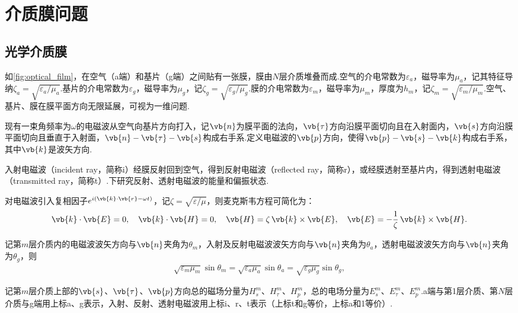 
\chapter{介质膜问题}

\section{光学介质膜}
如\cref{fig:optical_film}，在空气（a端）和基片（g端）之间贴有一张膜，膜由\(N\)层介质堆叠而成.空气的介电常数为\(\varepsilon_a\)，磁导率为\(\mu_a\)，记其特征导纳\(\zeta_a = \sqrt{\varepsilon_a/\mu_a}\).基片的介电常数为\(\varepsilon_g\)，磁导率为\(\mu_g\)，记\(\zeta_g = \sqrt{\varepsilon_g/\mu_g}\).膜的介电常数为\(\varepsilon_m\)，磁导率为\(\mu_m\)，厚度为\(h_m\)，记\(\zeta_m = \sqrt{\varepsilon_m/\mu_m}\).空气、基片、膜在膜平面方向无限延展，可视为一维问题.

现有一束角频率为\(\omega\)的电磁波从空气向基片方向打入，记\(\vb{n}\)为膜平面的法向，\(\vb{\tau}\)方向沿膜平面切向且在入射面内，\(\vb{s}\)方向沿膜平面切向且垂直于入射面，\(\vb{n}-\vb{\tau}-\vb{s}\)构成右手系.定义电磁波的\(\vb{p}\)方向，使得\(\vb{p}-\vb{s}-\vb{k}\)构成右手系，其中\(\vb{k}\)是波矢方向.

入射电磁波（incident ray，简称i）经膜反射回到空气，得到反射电磁波（reflected ray，简称r），或经膜透射至基片内，得到透射电磁波（transmitted ray，简称t）.下研究反射、透射电磁波的能量和偏振状态.

对电磁波引入复相因子\(e^{i(\vb{k}\cdot\vb{r}-\omega t)}\)，记\(\zeta = \sqrt{\varepsilon/\mu}\)，则麦克斯韦方程可简化为：
\begin{align*}
	\vb{k}\cdot\vb{E} = 0,\quad \vb{k}\cdot\vb{H} = 0,\quad \vb{H} = \zeta\,\vb{k}\times\vb{E},\quad \vb{E} = -\dfrac{1}{\zeta}\,\vb{k}\times\vb{H}.
\end{align*}

记第\(m\)层介质内的电磁波波矢方向与\(\vb{n}\)夹角为\(\theta_m\)，入射及反射电磁波波矢方向与\(\vb{n}\)夹角为\(\theta_a\)，透射电磁波波矢方向与\(\vb{n}\)夹角为\(\theta_g\)，则
\begin{align*}
	\sqrt{\varepsilon_m\mu_m}\sin\theta_m = \sqrt{\varepsilon_a\mu_a}\sin\theta_a = \sqrt{\varepsilon_g\mu_g}\sin\theta_g,
\end{align*}

记第\(m\)层介质上部的\(\vb{s}\)、\(\vb{\tau}\)、\(\vb{p}\)方向总的磁场分量为\(H_s^m\)、\(H_\tau^m\)、\(H_p^m\)，总的电场分量为\(E_s^m\)、\(E_\tau^m\)、\(E_p^m\).a端与第1层介质、第\(N\)层介质与g端用上标a、g表示，入射、反射、透射电磁波用上标i、r、t表示（上标t和g等价，上标a和1等价）.

